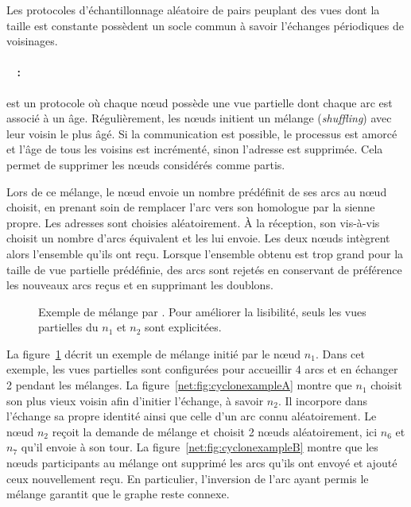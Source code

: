 Les protocoles d'échantillonnage aléatoire de pairs peuplant des vues dont la
taille est constante possèdent un socle commun à savoir l'échanges périodiques
de voisinages.

\paragraph{\CYCLON~\cite{voulgaris2005cyclon} :} est un protocole où chaque nœud
possède une vue partielle dont chaque arc est associé à un âge. Régulièrement,
les nœuds initient un mélange (\emph{shuffling}) avec leur voisin le plus
âgé. Si la communication est possible, le processus est amorcé et l'âge de tous
les voisins est incrémenté, sinon l'adresse est supprimée. Cela permet de
supprimer les nœuds considérés comme partis.

\noindent Lors de ce mélange, le nœud envoie un nombre prédéfinit de ses arcs au
nœud choisit, en prenant soin de remplacer l'arc vers son homologue par la
sienne propre. Les adresses sont choisies aléatoirement. À la réception, son
vis-à-vis choisit un nombre d'arcs équivalent et les lui envoie. Les deux nœuds
intègrent alors l'ensemble qu'ils ont reçu. Lorsque l'ensemble obtenu est trop
grand pour la taille de vue partielle prédéfinie, des arcs sont rejetés en
conservant de préférence les nouveaux arcs reçus et en supprimant les doublons.
  
\begin{figure}
  \centering
  \hspace{35pt}
  \caption[Exemple de mélange dans \CYCLON]
  {\label{net:fig:cyclonexample} Exemple de mélange par \CYCLON. Pour
    améliorer la lisibilité, seuls les vues partielles du $n_1$ et $n_2$ sont
    explicitées.}
\end{figure}
  
\noindent La figure~\ref{net:fig:cyclonexample} décrit un exemple de mélange
initié par le nœud $n_1$. Dans cet exemple, les vues partielles sont configurées
pour accueillir 4 arcs et en échanger 2 pendant les mélanges. La
figure~\ref{net:fig:cyclonexampleA} montre que $n_1$ choisit son plus vieux
voisin afin d'initier l'échange, à savoir $n_2$. Il incorpore dans l'échange sa
propre identité ainsi que celle d'un arc connu aléatoirement. Le nœud $n_2$
reçoit la demande de mélange et choisit 2 nœuds aléatoirement, ici $n_6$ et
$n_7$ qu'il envoie à son tour. La figure~\ref{net:fig:cyclonexampleB} montre que
les nœuds participants au mélange ont supprimé les arcs qu'ils ont envoyé et
ajouté ceux nouvellement reçu. En particulier, l'inversion de l'arc ayant permis
le mélange garantit que le graphe reste connexe.

